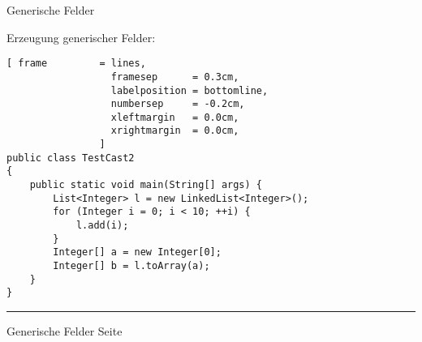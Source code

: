 \documentclass{slides}
\newcounter{mypage}
\begin{document}
\begin{slide}{}
\normalsize

\begin{center}
Generische Felder
\end{center}
\vspace*{0.5cm}

\footnotesize
Erzeugung generischer Felder:
\begin{Verbatim}[ frame         = lines, 
                  framesep      = 0.3cm, 
                  labelposition = bottomline,
                  numbersep     = -0.2cm,
                  xleftmargin   = 0.0cm,
                  xrightmargin  = 0.0cm,
                ]
public class TestCast2 
{
    public static void main(String[] args) {
        List<Integer> l = new LinkedList<Integer>();
        for (Integer i = 0; i < 10; ++i) {
            l.add(i);
        }
        Integer[] a = new Integer[0];
        Integer[] b = l.toArray(a);
    }
}
\end{Verbatim}


\vspace*{\fill}
\tiny \addtocounter{mypage}{1}
\rule{17cm}{1mm}
Generische Felder \hspace*{\fill} Seite 
\end{slide}


\end{document}
